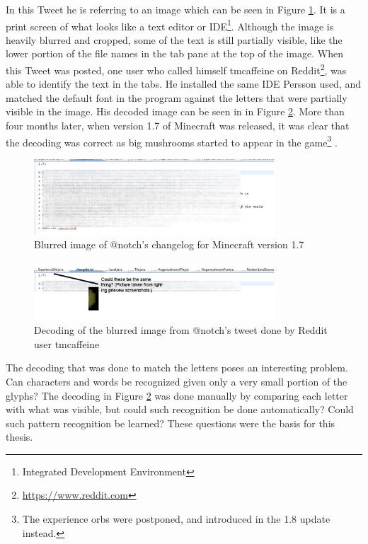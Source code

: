 In this Tweet he is referring to an image which can be seen in Figure \ref{fig:notch_imgur}. It is a print screen of what looks like a text editor or IDE\footnote{Integrated Development Environment}. Although the image is heavily blurred and cropped, some of the text is still partially visible, like the lower portion of the file names in the tab pane at the top of the image. When this Tweet was posted, one user who called himself tmcaffeine on Reddit\footnote{\url{https://www.reddit.com}}, was able to identify the text in the tabs. He installed the same IDE Persson used, and matched the default font in the program against the letters that were partially visible in the image. His decoded image can be seen in in Figure \ref{fig:notch_eclipse_decoded}. More than four months later, when version 1.7 of Minecraft was released, it was clear that the decoding was correct as big mushrooms started to appear in the game\footnote{The experience orbs were postponed, and introduced in the 1.8 update instead.} \citep{misc-minecraft.172-changelog}.

\begin{figure}[h]
    \centering
    \includegraphics[width=0.8\textwidth]{fig/chapter1/notch_eclipse.jpg}
    \caption{Blurred image of @notch's changelog for Minecraft version 1.7}
    \label{fig:notch_imgur}
\end{figure}

\begin{figure}[ht]
    \centering
    \includegraphics[width=0.8\textwidth]{fig/chapter1/notch_eclipse_decoded.jpg}
    \caption{Decoding of the blurred image from @notch's tweet done by Reddit user tmcaffeine}
    \label{fig:notch_eclipse_decoded}
\end{figure}

The decoding that was done to match the letters poses an interesting problem. Can characters and words be recognized given only a very small portion of the glyphs? The decoding in Figure \ref{fig:notch_eclipse_decoded} was done manually by comparing each letter with what was visible, but could such recognition be done automatically? Could such pattern recognition be learned? These questions were the basis for this thesis.


